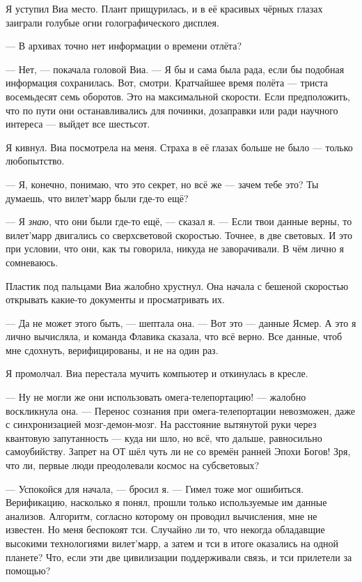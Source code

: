 Я уступил Виа место.
Плант прищурилась, и в её красивых чёрных глазах заиграли голубые огни голографического дисплея.

--- В архивах точно нет информации о времени отлёта?

--- Нет, --- покачала головой Виа.
--- Я бы и сама была рада, если бы подобная информация сохранилась.
Вот, смотри.
Кратчайшее время полёта --- триста восемьдесят семь оборотов.
Это на максимальной скорости.
Если предположить, что по пути они останавливались для починки, дозаправки или ради научного интереса --- выйдет все шестьсот.

Я кивнул.
Виа посмотрела на меня.
Страха в её глазах больше не было --- только любопытство.

--- Я, конечно, понимаю, что это секрет, но всё же --- зачем тебе это?
Ты думаешь, что вилет'марр были где-то ещё?

--- Я \emph{знаю}, что они были где-то ещё, --- сказал я.
--- Если твои данные верны, то вилет'марр двигались со сверхсветовой скоростью.
Точнее, в две световых.
И это при условии, что они, как ты говорила, никуда не заворачивали.
В чём лично я сомневаюсь.

Пластик под пальцами Виа жалобно хрустнул.
Она начала с бешеной скоростью открывать какие-то документы и просматривать их.

--- Да не может этого быть, --- шептала она.
--- Вот это --- данные Ясмер.
А это я лично вычисляла, и команда Флавика сказала, что всё верно.
Все данные, чтоб мне сдохнуть, верифицированы, и не на один раз.

Я промолчал.
Виа перестала мучить компьютер и откинулась в кресле.

--- Ну не могли же они использовать омега-телепортацию! --- жалобно воскликнула она.
--- Перенос сознания при омега-телепортации невозможен, даже с синхронизацией мозг-демон-мозг.
На расстояние вытянутой руки через квантовую запутанность --- куда ни шло, но всё, что дальше, равносильно самоубийству.
Запрет на ОТ шёл чуть ли не со времён ранней Эпохи Богов!
Зря, что ли, первые люди преодолевали космос на субсветовых?

--- Успокойся для начала, --- бросил я.
--- Гимел тоже мог ошибиться.
Верификацию, насколько я понял, прошли только используемые им данные анализов.
Алгоритм, согласно которому он проводил вычисления, мне не известен.
Но меня беспокоят тси.
Случайно ли то, что некогда обладавщие высокими технологиями вилет'марр, а затем и тси в итоге оказались на одной планете?
Что, если эти две цивилизации поддерживали связь, и тси прилетели за помощью?

